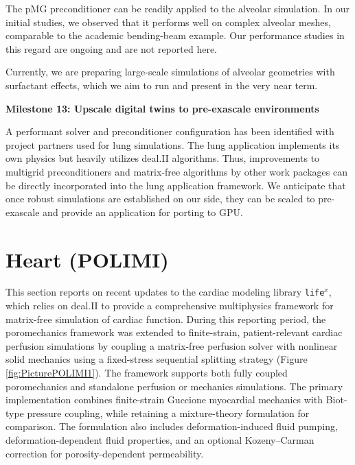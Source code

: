 \documentclass[a4paper,12pt]{article}
\begin{document}
The pMG preconditioner can be readily applied to the alveolar simulation. In our initial studies, we observed that it performs well on complex alveolar meshes, comparable to the academic bending-beam example. Our performance studies in this regard are ongoing and are not reported here.

Currently, we are preparing large-scale simulations of alveolar geometries with surfactant effects, which we aim to run and present in the very near term.


\noindent\textbf{Milestone 13: Upscale digital twins to pre-exascale environments}

A performant solver and preconditioner configuration has been identified with project partners used for lung simulations. The lung application implements its own physics but heavily utilizes deal.II algorithms. Thus, improvements to multigrid preconditioners and matrix-free algorithms by other work packages can be directly incorporated into the lung application framework. We anticipate that once robust simulations are established on our side, they can be scaled to pre-exascale and provide an application for porting to GPU.


\section{Heart (POLIMI)}\label{sec:polimi}

This section reports on recent updates to the cardiac modeling library \texttt{life$^x$}, which relies on deal.II to provide a comprehensive multiphysics framework for matrix-free simulation of cardiac function.
During this reporting period, the poromechanics framework was extended to finite-strain, patient-relevant cardiac perfusion simulations by coupling a matrix-free perfusion solver with nonlinear solid mechanics using a fixed-stress sequential splitting strategy (Figure \ref{fig:PicturePOLIMI1}). The framework supports both fully coupled poromechanics and standalone perfusion or mechanics simulations. The primary implementation combines finite-strain Guccione myocardial mechanics with Biot-type pressure coupling, while retaining a mixture-theory formulation for comparison. The formulation also includes deformation-induced fluid pumping, deformation-dependent fluid properties, and an optional Kozeny–Carman correction for porosity-dependent permeability.
\end{document}
